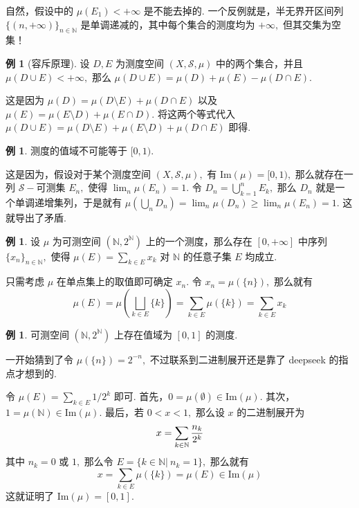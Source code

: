 \documentclass[12pt, a4paper, oneside]{book}
\numberwithin{figure}{section}
\theoremstyle{definition}
\newtheorem{example}[theorem]{例}
\begin{document}
自然，假设中的 $\mu(E_1)<+\infty$ 是不能去掉的. 一个反例就是，半无界开区间列 $\{(n,+\infty)\}_{n\in\mathbb N}$ 是单调递减的，其中每个集合的测度均为 $+\infty,$ 但其交集为空集！

\begin{example}[容斥原理]\label{容斥原理}
    设 $D,E$ 为测度空间 $(X,\mathcal S,\mu)$ 中的两个集合，并且 $\mu(D\cup E)<+\infty,$ 那么 $\mu(D\cup E)=\mu(D)+\mu(E)-\mu(D\cap E).$
\end{example}
这是因为 $\mu(D)=\mu(D\setminus E)+\mu(D\cap E)$ 以及 $\mu(E)=\mu(E\setminus D)+\mu(E\cap D).$
将这两个等式代入 $\mu(D\cup E)=\mu(D\setminus E)+\mu(E\setminus D)+\mu(D\cap E)$ 即得.

\begin{example}
    测度的值域不可能等于 $[0,1).$
\end{example}

这是因为，假设对于某个测度空间 $(X,\mathcal S,\mu),$ 有 $\mathrm{Im}(\mu)=[0,1),$ 那么就存在一列 $\mathcal S-$可测集 $E_n,$ 使得 $\lim_n\mu(E_n)=1.$ 
令 $D_n=\bigcup_{k=1}^n E_k,$ 那么 $D_n$ 就是一个单调递增集列，于是就有 $\mu(\bigcup_n D_n)=\lim_n \mu(D_n)\geq\lim_n \mu(E_n)=1.$ 
这就导出了矛盾.

\begin{example}
    设 $\mu$ 为可测空间 $(\mathbb N,2^{\mathbb N})$ 上的一个测度，那么存在 $[0,+\infty]$ 中序列 $\{x_n\}_{n\in\mathbb N},$ 使得 $\mu(E)=\sum_{k\in E}x_k$ 对 $\mathbb N$ 的任意子集 $E$ 均成立.
\end{example}
只需考虑 $\mu$ 在单点集上的取值即可确定 $x_n.$ 令 $x_n = \mu(\{n\}),$ 那么就有
\begin{equation}
    \mu(E) =\mu\left(\bigsqcup_{k\in E}\{k\}\right) = \sum_{k\in E}\mu(\{k\}) = \sum_{k\in E}x_k
\end{equation}

\begin{example}\label{ex:countable_measure_space_with_range_in_0_1}
    可测空间 $(\mathbb N,2^{\mathbb N})$ 上存在值域为 $[0,1]$ 的测度.
\end{example}
一开始猜到了令 $\mu(\{n\})=2^{-n},$ 不过联系到二进制展开还是靠了 deepseek 的指点才想到的.


令 $\mu(E)=\sum_{k\in E}1/2^k$ 即可. 首先，$0=\mu(\emptyset)\in \mathrm{Im}(\mu).$ 其次，$1=\mu(\mathbb N)\in \mathrm{Im}(\mu).$
最后，若 $0<x<1,$ 那么设 $x$ 的二进制展开为 
\begin{equation}
    x = \sum_{k\in\mathbb N}{n_k\over 2^k}
\end{equation}
其中 $n_k=0$ 或 $1,$ 那么令 $E=\{k\in\mathbb N|\ n_k=1\},$ 那么就有
\begin{equation}
    x = \sum_{k\in E}\mu(\{k\}) = \mu(E)\in\mathrm{Im}(\mu)
\end{equation}
这就证明了 $\mathrm{Im}(\mu)=[0,1].$ 
\end{document}
